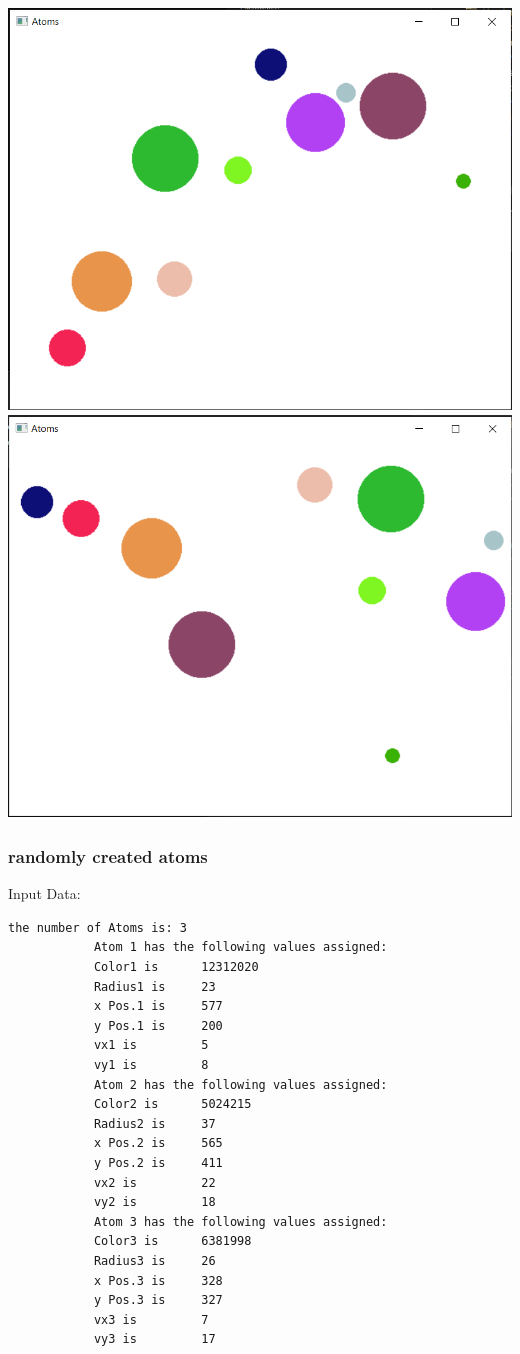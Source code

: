 \documentclass[11pt,titlepage]{article}
\begin{document}
			\includegraphics[scale=0.5]{pictures/input_collision.png}
			\includegraphics[scale=0.5]{pictures/input_collision_final.png}
			
			\subsubsection{randomly created atoms}
			Input Data:
			\begin{lstlisting}[numbers=none]
			the number of Atoms is: 3
			Atom 1 has the following values assigned:
			Color1 is      12312020
			Radius1 is     23
			x Pos.1 is     577
			y Pos.1 is     200
			vx1 is         5
			vy1 is         8
			Atom 2 has the following values assigned:
			Color2 is      5024215
			Radius2 is     37
			x Pos.2 is     565
			y Pos.2 is     411
			vx2 is         22
			vy2 is         18
			Atom 3 has the following values assigned:
			Color3 is      6381998
			Radius3 is     26
			x Pos.3 is     328
			y Pos.3 is     327
			vx3 is         7
			vy3 is         17
			\end{lstlisting}
		
\end{document}
